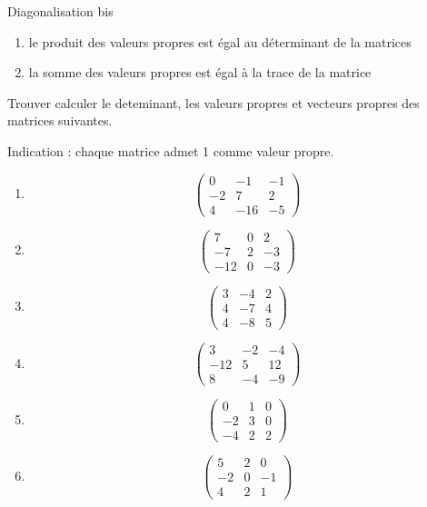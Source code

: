 \documentclass{article}
\begin{document}
\begin{center}
{\Large Diagonalisation bis}
\end{center}



\begin{enumerate}
	\item le produit des valeurs propres est \'egal au d\'eterminant de la matrices
	\item la somme des valeurs propres est \'egal à la trace de la matrice

\end{enumerate}

Trouver calculer le deteminant, les valeurs propres et vecteurs propres des matrices suivantes.

Indication : chaque matrice admet 1 comme valeur propre.

\begin{enumerate}

\item $$\begin{pmatrix}
0 & -1 & -1 \\ 
-2 & 7 & 2 \\ 
4 & -16 & -5
\end{pmatrix}$$

\item $$\begin{pmatrix}
7 & 0 & 2 \\ 
-7 & 2 & -3 \\ 
-12 & 0 & -3
\end{pmatrix}$$

\item $$\begin{pmatrix}
3 & -4 & 2 \\ 
4 & -7 & 4 \\ 
4 & -8 & 5
\end{pmatrix}$$

\item $$\begin{pmatrix}
3 & -2 & -4 \\ 
-12 & 5 & 12 \\ 
8 & -4 & -9
\end{pmatrix}$$

\item $$\begin{pmatrix}
0 & 1 & 0 \\ 
-2 & 3 & 0 \\ 
-4 & 2 & 2
\end{pmatrix}$$

\item $$\begin{pmatrix}
5 & 2 & 0 \\ 
-2 & 0 & -1 \\ 
4 & 2 & 1
\end{pmatrix}$$
\end{enumerate}
\end{document}
